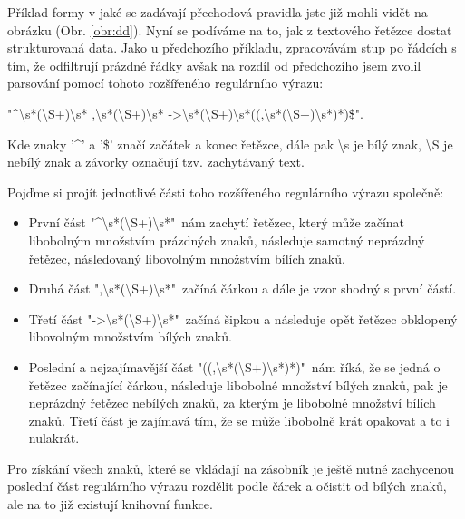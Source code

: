 
Příklad formy v jaké se zadávají přechodová pravidla jste již mohli vidět na obrázku (Obr. \ref{obr:dd}). Nyní se podíváme na to, jak z textového řetězce dostat strukturovaná data. Jako u předchozího příkladu, zpracovávám stup po řádcích s tím, že odfiltrují prázdné řádky avšak na rozdíl od předchozího jsem zvolil parsování pomocí tohoto rozšířeného regulárního výrazu: 

"\textasciicircum\textbackslash{}s*(\textbackslash{}S+)\textbackslash{}s*
,\textbackslash{}s*(\textbackslash{}S+)\textbackslash{}s*
->\textbackslash{}s*(\textbackslash{}S+)\textbackslash{}s*((,\textbackslash{}s*(\textbackslash{}S+)\textbackslash{}s*)*)\$". 

Kde znaky '\textasciicircum' a '\$' značí začátek a konec řetězce, dále pak \textbackslash{}s je bílý znak, \textbackslash{}S je nebílý znak a závorky označují tzv. zachytávaný text.

Pojďme si projít jednotlivé části toho rozšířeného regulárního výrazu společně:

\begin{itemize}
	\item První část "\textasciicircum\textbackslash{}s*(\textbackslash{}S+)\textbackslash{}s*"\ nám zachytí řetězec, který může začínat libobolným množstvím prázdných znaků, následuje samotný neprázdný řetězec, následovaný libovolným množstvím bílích znaků.
	\item Druhá část ",\textbackslash{}s*(\textbackslash{}S+)\textbackslash{}s*"\ začíná čárkou a dále je vzor shodný s první částí.
	\item Třetí část "->\textbackslash{}s*(\textbackslash{}S+)\textbackslash{}s*"\ začíná šipkou a následuje opět řetězec obklopený libovolným množstvím bílých znaků.
	\item Poslední a nejzajímavější část "((,\textbackslash{}s*(\textbackslash{}S+)\textbackslash{}s*)*)"\ nám říká, že se jedná o řetězec začínající čárkou, následuje libobolné množství bílých znaků, pak je neprázdný řetězec nebílých znaků, za kterým je libobolné množství bílích znaků. Třetí část je zajímavá tím, že se může libobolně krát opakovat a to i nulakrát.
\end{itemize}

Pro získání všech znaků, které se vkládají na zásobník je ještě nutné zachycenou poslední část regulárního výrazu rozdělit podle čárek a očistit od bílých znaků, ale na to již existují knihovní funkce.

